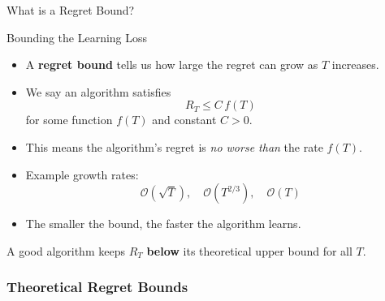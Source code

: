 \documentclass[aspectratio=169]{beamer}
\begin{document}
\begin{frame}{What is a Regret Bound?}

\begin{block}{\centering Bounding the Learning Loss}
\begin{itemize}
    \item A \textbf{regret bound} tells us how large the regret can grow as $T$ increases.
    \item We say an algorithm satisfies
    \[
    R_T \leq C\,f(T)
    \]
    for some function $f(T)$ and constant $C>0$.
    \item This means the algorithm’s regret is \textit{no worse than} the rate $f(T)$.
    \item Example growth rates:
    \[
    \mathcal{O}(\sqrt{T}), \quad \mathcal{O}(T^{2/3}), \quad \mathcal{O}(T)
    \]
    \item The smaller the bound, the faster the algorithm learns.
\end{itemize}
\end{block}

\vspace{0.5em}
\pause
\centering
\textcolor{gray!70}{A good algorithm keeps $R_T$ \textbf{below} its theoretical upper bound for all $T$.}

\end{frame}


\begin{frame}[fragile]
\frametitle{Theoretical Regret Bounds}
\begin{figure}
    \centering
    
\end{figure}
\end{frame}
\end{document}
